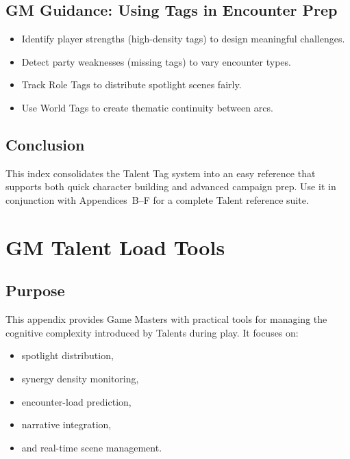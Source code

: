 \documentclass[11pt]{book}
\begin{document}
\section{GM Guidance: Using Tags in Encounter Prep}

\begin{itemize}
    \item Identify player strengths (high-density tags) to design meaningful challenges.
    \item Detect party weaknesses (missing tags) to vary encounter types.
    \item Track Role Tags to distribute spotlight scenes fairly.
    \item Use World Tags to create thematic continuity between arcs.
\end{itemize}

\section{Conclusion}

This index consolidates the Talent Tag system into an easy reference
that supports both quick character building and advanced campaign prep.
Use it in conjunction with Appendices~B--F for a complete Talent reference suite.


\chapter{GM Talent Load Tools}

\section{Purpose}

This appendix provides Game Masters with practical tools for managing the cognitive complexity introduced by Talents during play.  
It focuses on:
\begin{itemize}
    \item spotlight distribution,
    \item synergy density monitoring,
    \item encounter-load prediction,
    \item narrative integration,
    \item and real-time scene management.
\end{itemize}
\end{document}
